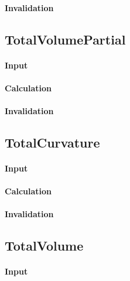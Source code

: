 \paragraph{Invalidation}

\bigskip

\subsection{TotalVolumePartial}

\paragraph{Input}

\paragraph{Calculation}

\paragraph{Invalidation}

\bigskip

\subsection{TotalCurvature}

\paragraph{Input}

\paragraph{Calculation}

\paragraph{Invalidation}

\bigskip

\subsection{TotalVolume}

\paragraph{Input}

